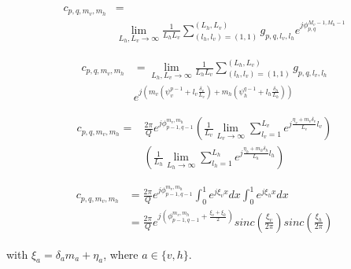\begin{align}
    c_{p,q, m_v, m_h} &= \nonumber\\& \lim_{L_h, L_v\rightarrow \infty} \frac{1}{L_hL_v}\sum_{(l_h, l_v)=(1,1)}^{(L_h, L_v)} g_{p,q, l_v, l_h}e^{j\phi_{p,q}^{M_v-1, M_h-1}}
\end{align}


\begin{align}
    c_{p,q, m_v, m_h} &=  \lim_{L_h, L_v\rightarrow \infty} \frac{1}{L_hL_v}\sum_{(l_h, l_v)=(1,1)}^{(L_h, L_v)} g_{p,q, l_v, l_h}\nonumber \\&e^{j\left(m_v(\psi^{p-1}_{v}+l_v\frac{\delta_v}{L_v})+ m_h(\psi^{q-1}_{h} + l_h\frac{\delta_h}{L_h}) \right)}
\end{align}


\begin{align}
    c_{p,q, m_v, m_h} =&  \frac{2\pi}{Q}e^{j\phi_{p-1, q-1}^{m_v, m_h}}
    \left(\frac{1}{L_v}\lim_{ L_v\rightarrow \infty} \sum_{l_v=1}^{L_v} e^{j\frac{\eta_v+ m_v\delta_v}{L_v} l_v}\right) \nonumber\\&
    \left(\frac{1}{L_h}\lim_{ L_h\rightarrow \infty} \sum_{l_h=1}^{L_h} e^{j\frac{\eta_h+ m_h\delta_h}{L_h} l_h}\right)
\end{align}

\begin{align}
    c_{p,q, m_v, m_h} &=  \frac{2\pi}{Q}e^{j\phi_{p-1, q-1}^{m_v, m_h}}
    \int_{0}^{1} e^{j\xi_v x}dx\int_{0}^{1} e^{j\xi_h x}dx \nonumber\\&
    = \frac{2\pi}{Q}e^{j(\phi_{p-1, q-1}^{m_v, m_h}+ \frac{\xi_v+\xi_h}{2})} sinc(\frac{\xi_v}{2\pi})sinc(\frac{\xi_h}{2\pi})
\end{align}

with $\xi_a = {\delta_a}{m_a} + \eta_a$, where $a\in \{v,h\}$. 


